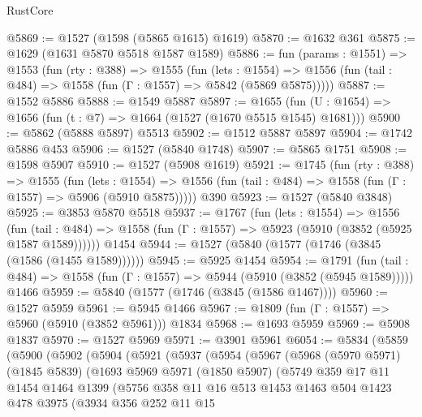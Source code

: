 \begin{lexlean}{RustCore}
\begin{coremodule}
@5869 := @1527 (@1598 (@5865 @1615) @1619)
@5870 := @1632 @361
@5875 := @1629 (@1631 @5870 @5518 @1587 @1589)
@5886 := fun (params : @1551) =>
  @1553
    (fun (rty : @388) =>
    @1555
      (fun (lets : @1554) =>
      @1556 (fun (tail : @484) => @1558 (fun (Γ : @1557) => @5842 (@5869 @5875)))))
@5887 := @1552 @5886
@5888 := @1549 @5887
@5897 := @1655 (fun (U : @1654) => @1656 (fun (t : @7) => @1664 (@1527 (@1670 @5515 @1545) @1681)))
@5900 := @5862 (@5888 @5897) @5513
@5902 := @1512 @5887 @5897
@5904 := @1742 @5886 @453
@5906 := @1527 (@5840 @1748)
@5907 := @5865 @1751
@5908 := @1598 @5907
@5910 := @1527 (@5908 @1619)
@5921 := @1745
    (fun (rty : @388) =>
    @1555
      (fun (lets : @1554) =>
      @1556 (fun (tail : @484) => @1558 (fun (Γ : @1557) => @5906 (@5910 @5875)))))
    @390
@5923 := @1527 (@5840 @3848)
@5925 := @3853 @5870 @5518
@5937 := @1767
    (fun (lets : @1554) =>
    @1556
      (fun (tail : @484) => @1558 (fun (Γ : @1557) => @5923 (@5910 (@3852 (@5925 @1587 @1589))))))
    @1454
@5944 := @1527 (@5840 (@1577 (@1746 (@3845 (@1586 (@1455 @1589))))))
@5945 := @5925 @1454
@5954 := @1791
    (fun (tail : @484) => @1558 (fun (Γ : @1557) => @5944 (@5910 (@3852 (@5945 @1589)))))
    @1466
@5959 := @5840 (@1577 (@1746 (@3845 (@1586 @1467))))
@5960 := @1527 @5959
@5961 := @5945 @1466
@5967 := @1809 (fun (Γ : @1557) => @5960 (@5910 (@3852 @5961))) @1834
@5968 := @1693 @5959
@5969 := @5908 @1837
@5970 := @1527 @5969
@5971 := @3901 @5961
@6054 := @5834
    (@5859
      (@5900
        (@5902
          (@5904
            (@5921
              (@5937
                (@5954
                  (@5967
                    (@5968
                      (@5970 @5971)
                      (@1845 @5839)
                      (@1693
                        @5969
                        @5971
                        (@1850 @5907)
                        (@5749
                          @359
                          @17
                          @11
                          @1454
                          @1464
                          @1399
                          (@5756
                            @358
                            @11
                            @16
                            @513
                            @1453
                            @1463
                            @504
                            @1423
                            @478
                            @3975
                            (@3934
                              @356
                              @252
                              @11
                              @15

\end{coremodule}
\end{lexlean}
